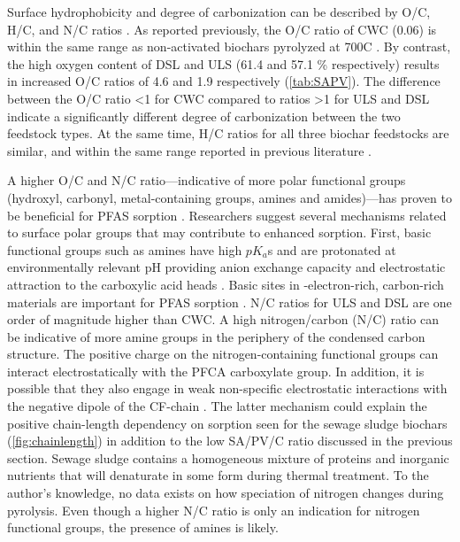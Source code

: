 Surface hydrophobicity and degree of carbonization can be described by O/C, H/C, and N/C ratios \citep{chun2004compositions}. As reported previously, the O/C ratio of CWC (0.06) is within the same range as non-activated biochars pyrolyzed at 700\textdegree C \citep{LehmannAndJoseph2015, chun2004compositions,kupryianchyk2016biochar}. By contrast, the high oxygen content of DSL and ULS (61.4 and 57.1 \% respectively) results in increased O/C ratios of 4.6 and 1.9 respectively (\cref{tab:SAPV}). The difference between the O/C ratio \textless 1 for CWC compared to ratios \textgreater 1 for ULS and DSL indicate a significantly different degree of carbonization between the two feedstock types. At the same time, H/C ratios for all three biochar feedstocks are similar, and within the same range reported in previous literature \citep{chun2004compositions,kupryianchyk2016biochar}. 

A higher O/C and N/C ratio---indicative of more polar functional groups (hydroxyl, carbonyl, metal-containing groups, amines and amides)---has proven to be beneficial for PFAS sorption \citep{du2014adsorption,fabregat2022examining}. Researchers suggest several mechanisms related to surface polar groups that may contribute to enhanced sorption. First, basic functional groups such as amines have high $pK_a$s and are protonated at environmentally relevant pH providing anion exchange capacity and electrostatic attraction to the carboxylic acid heads \citep{deng2010removal}. Basic sites in \textpi-electron-rich, carbon-rich materials are important for PFAS sorption \citep{saeidi2020understanding}. N/C ratios for ULS and DSL are one order of magnitude higher than CWC. A high nitrogen/carbon (N/C) ratio can be indicative of more amine groups in the periphery of the condensed carbon structure. The positive charge on the nitrogen-containing functional groups can interact electrostatically with the PFCA carboxylate group. In addition, it is possible that they also engage in weak non-specific electrostatic interactions with the negative dipole of the CF-chain \citep{xiao2011effects}. The latter mechanism could explain the positive chain-length dependency on sorption seen for the sewage sludge biochars (\cref{fig:chainlength}) in addition to the low SA/PV/C ratio discussed in the previous section. Sewage sludge contains a homogeneous mixture of proteins and inorganic nutrients that will denaturate in some form during thermal treatment. To the author's knowledge, no data exists on how speciation of nitrogen changes during pyrolysis. Even though a higher N/C ratio is only an indication for nitrogen functional groups, the presence of amines is likely.

